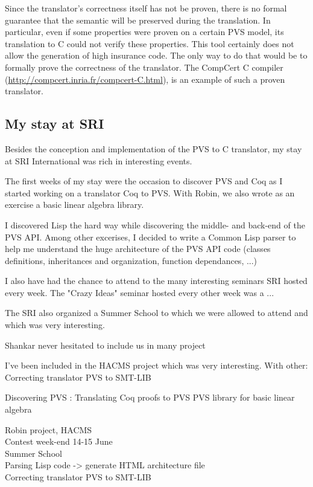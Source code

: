 \documentclass[12pt,a4paper]{article}
\begin{document}
Since the translator's correctness itself has not be proven, there is no formal guarantee that the semantic will be preserved during the translation. In particular, even if some properties were proven on a certain PVS model, its translation to C could not verify these properties. This tool certainly does not allow the generation of high insurance code. The only way to do that would be to formally prove the correctness of the translator. The CompCert C compiler (\href{http://compcert.inria.fr}{http://compcert.inria.fr/compcert-C.html}), is an example of such a proven translator.


\subsection{My stay at SRI}

Besides the conception and implementation of the PVS to C translator, my stay at SRI International was rich in interesting events. 

The first weeks of my stay were the occasion to discover PVS and Coq as I started working on a translator Coq to PVS. With Robin, we also wrote as an exercise a basic linear algebra library.

I discovered Lisp the hard way while discovering the middle- and back-end of the PVS API. Among other excerises, I decided to write a Common Lisp parser to help me understand the huge architecture of the PVS API code (classes definitions, inheritances and organization, function dependances, ...)

I also have had the chance to attend to the many interesting seminars SRI hosted every week. The "Crazy Ideas" seminar hosted every other week was a ...

The SRI also organized a Summer School to which we were allowed to attend and which was very interesting.

Shankar never hesitated to include us in many project

I've been included in the HACMS project which was very interesting.
With other:
Correcting translator PVS to SMT-LIB

Discovering PVS :
Translating Coq proofs to PVS
PVS library for basic linear algebra

Robin project, HACMS \\
Contest week-end 14-15 June \\
Summer School \\
Parsing Lisp code -> generate HTML architecture file\\
Correcting translator PVS to SMT-LIB
\end{document}
